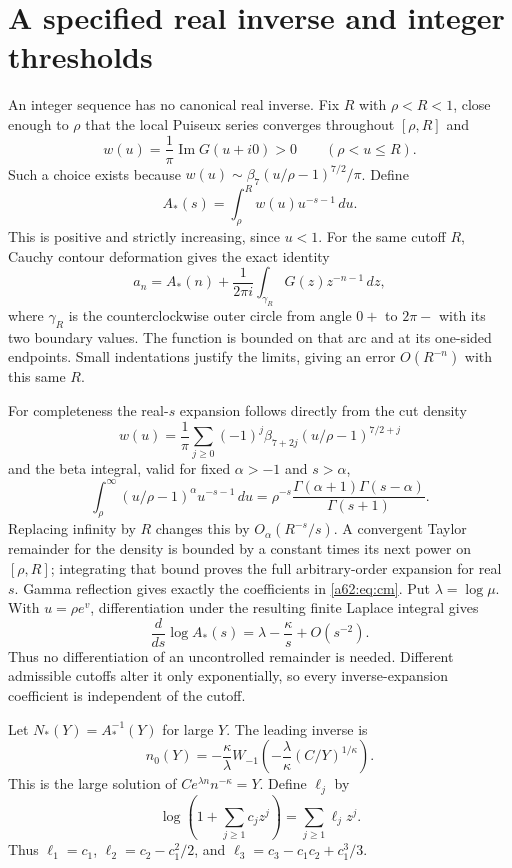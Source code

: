 \documentclass[11pt,letterpaper]{article}
\theoremstyle{remark}\newtheorem{remark}[theorem]{Remark}
\newcommand{\Imn}{\operatorname{Im}}
\begin{document}
\section{A specified real inverse and integer thresholds}\label{a62:sec:inverse}
An integer sequence has no canonical real inverse. Fix $R$ with $\rho<R<1$, close enough to $\rho$ that the local Puiseux series converges throughout $[\rho,R]$ and
\[
 w(u)=\frac1\pi\Imn G(u+i0)>0\qquad(\rho<u\le R).
\]
Such a choice exists because $w(u)\sim\beta_7(u/\rho-1)^{7/2}/\pi$. Define
\begin{equation}\label{a62:eq:realmodel}
 A_*(s)=\int_\rho^R w(u)u^{-s-1}\,du.
\end{equation}
This is positive and strictly increasing, since $u<1$. For the same cutoff $R$, Cauchy contour deformation gives the exact identity
\[
a_n=A_*(n)+\frac1{2\pi i}\int_{\gamma_R}G(z)z^{-n-1}\,dz,
\]
where $\gamma_R$ is the counterclockwise outer circle from angle $0+$ to $2\pi-$ with its two boundary values. The function is bounded on that arc and at its one-sided endpoints. Small indentations justify the limits, giving an error $O(R^{-n})$ with this same $R$.

For completeness the real-$s$ expansion follows directly from the cut density
\[
w(u)=\frac1\pi\sum_{j\ge0}(-1)^j\beta_{7+2j}(u/\rho-1)^{7/2+j}
\]
and the beta integral, valid for fixed $\alpha>-1$ and $s>\alpha$,
\[
\int_\rho^\infty (u/\rho-1)^\alpha u^{-s-1}\,du
=\rho^{-s}\frac{\Gamma(\alpha+1)\Gamma(s-\alpha)}{\Gamma(s+1)}.
\]
Replacing infinity by $R$ changes this by $O_\alpha(R^{-s}/s)$. A convergent Taylor remainder for the density is bounded by a constant times its next power on $[\rho,R]$; integrating that bound proves the full arbitrary-order expansion for real $s$. Gamma reflection gives exactly the coefficients in \eqref{a62:eq:cm}. Put $\lambda=\log\mu$. With $u=\rho e^v$, differentiation under the resulting finite Laplace integral gives
\[
\frac{d}{ds}\log A_*(s)=\lambda-\frac\kappa s+O(s^{-2}).
\]
Thus no differentiation of an uncontrolled remainder is needed. Different admissible cutoffs alter it only exponentially, so every inverse-expansion coefficient is independent of the cutoff.

Let $N_*(Y)=A_*^{-1}(Y)$ for large $Y$. The leading inverse is
\begin{equation}\label{a62:eq:lambert}
 n_0(Y)=-\frac\kappa\lambda W_{-1}\!\left(-\frac\lambda\kappa(C/Y)^{1/\kappa}\right).
\end{equation}
This is the large solution of $Ce^{\lambda n}n^{-\kappa}=Y$. Define $\ell_j$ by
\[
 \log\left(1+\sum_{j\ge1}c_jz^j\right)=\sum_{j\ge1}\ell_jz^j.
\]
Thus $\ell_1=c_1$, $\ell_2=c_2-c_1^2/2$, and $\ell_3=c_3-c_1c_2+c_1^3/3$.
\end{document}
